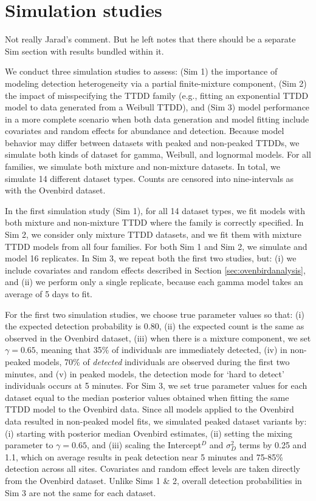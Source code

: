 \documentclass[useAMS,usenatbib,referee,12pt]{article}
\newcommand{\jarad}[1]{{\color{Orange} #1}}
\begin{document}
\section{Simulation studies}

\jarad{Not really Jarad's comment.  But he left notes that there should be a separate Sim section with results bundled within it.}

We conduct three simulation studies to assess: (Sim 1) the importance of modeling detection heterogeneity via a partial finite-mixture component, (Sim 2) the impact of misspecifying the TTDD family (e.g., fitting an exponential TTDD model to data generated from a Weibull TTDD), and (Sim 3) model performance in a more complete scenario when both data generation and model fitting include covariates and random effects for abundance and detection.  
Because model behavior may differ between datasets with peaked and non-peaked TTDDs, we simulate both kinds of dataset for gamma, Weibull, and lognormal models.  
For all families, we simulate both mixture and non-mixture datasets.  
In total, we simulate 14 different dataset types.  
Counts are censored into nine-intervals as with the Ovenbird dataset.

In the first simulation study (Sim 1), for all 14 dataset types, we fit models with both mixture and non-mixture TTDD where the family is correctly specified.  
In Sim 2, we consider only mixture TTDD datasets, and we fit them with mixture TTDD models from all four families.  
For both Sim 1 and Sim 2, we simulate and model 16 replicates.  
In Sim 3, we repeat both the first two studies, but: (i) we include covariates and random effects described in Section \ref{sec:ovenbirdanalysis}, and (ii) we perform only a single replicate, because each gamma model takes an average of 5 days to fit.

For the first two simulation studies, we choose true parameter values so that: (i) the expected detection probability is 0.80, (ii) the expected count is the same as observed in the Ovenbird dataset, (iii) when there is a mixture component, we set $\gamma = 0.65$, meaning that 35\% of individuals are immediately detected, (iv) in non-peaked models, 70\% of \textit{detected} individuals are observed during the first two minutes, and (v) in peaked models, the detection mode for `hard to detect' individuals occurs at 5 minutes.  
For Sim 3, we set true parameter values for each dataset equal to the median posterior values obtained when fitting the same TTDD model to the Ovenbird data.  
Since all models applied to the Ovenbird data resulted in non-peaked model fits, we simulated peaked dataset variants by: (i) starting with posterior median Ovenbird estimates, (ii) setting the mixing parameter to $\gamma = 0.65$, and (iii) scaling the Intercept$^D$ and $\sigma_D^2$ terms by 0.25 and 1.1, which on average results in peak detection near 5 minutes and 75-85\% detection across all sites.  
Covariates and random effect levels are taken directly from the Ovenbird dataset.  
Unlike Sims 1 \& 2, overall detection probabilities in Sim 3 are not the same for each dataset.
\end{document}
